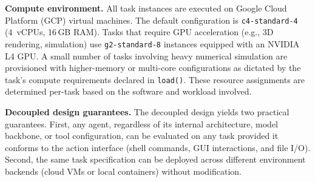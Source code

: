 \noindent \textbf{Compute environment.}
All task instances are executed on Google Cloud Platform (GCP) virtual machines. The default configuration is \texttt{c4-standard-4} (4~vCPUs, 16\,GB RAM). Tasks that require GPU acceleration (e.g., 3D rendering, simulation) use \texttt{g2-standard-8} instances equipped with an NVIDIA L4 GPU. A small number of tasks involving heavy numerical simulation are provisioned with higher-memory or multi-core configurations as dictated by the task's compute requirements declared in \texttt{load()}. These resource assignments are determined per-task based on the software and workload involved.

\noindent \textbf{Decoupled design guarantees.}
The decoupled design yields two practical guarantees. First, any agent, regardless of its internal architecture, model backbone, or tool configuration, can be evaluated on any task provided it conforms to the action interface (shell commands, GUI interactions, and file I/O). Second, the same task specification can be deployed across different environment backends (cloud VMs or local containers) without modification.

